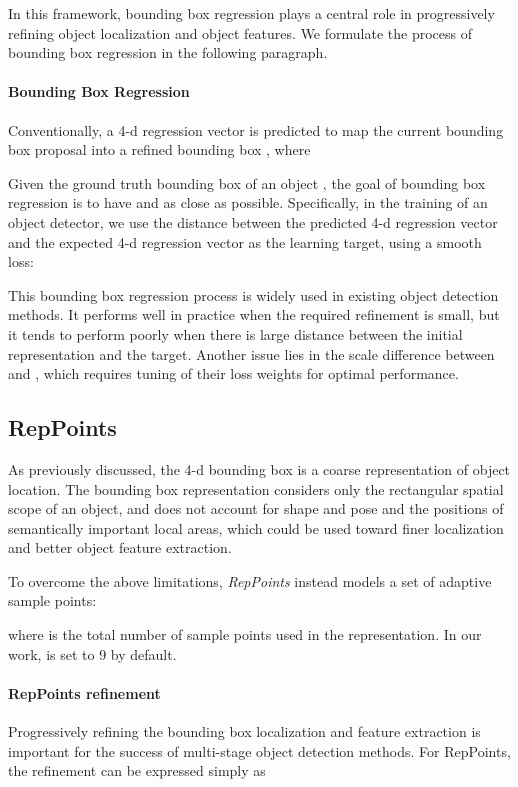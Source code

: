 \documentclass[10pt,twocolumn,letterpaper]{article}
\begin{document}
In this framework, bounding box regression plays a central role in progressively refining object localization and object features. We formulate the process of bounding box regression in the following paragraph.

\vspace{-5pt}
\paragraph{Bounding Box Regression} 
Conventionally, a 4-d regression vector  is predicted to map the current bounding box proposal  into a refined bounding box , where

 
Given the ground truth bounding box of an object , the goal of bounding box regression is to have  and  as close as possible. Specifically, in the training of an object detector, we use the distance between the predicted 4-d regression vector and the expected 4-d regression vector   as the learning target, using a smooth  loss: 
 

This bounding box regression process is widely used in existing object detection methods. It performs well in practice when the required refinement is small, but it tends to perform poorly when there is large distance between the initial representation and the target. Another issue lies in the scale difference between  and , which requires tuning of their loss weights for optimal performance.

\subsection{RepPoints}
\label{sec::reppoints}
As previously discussed, the 4-d bounding box is a coarse representation of object location. The bounding box representation considers only the rectangular spatial scope of an object, and does not account for shape and pose and the positions of semantically important local areas, which could be used toward finer localization and better object feature extraction. 

To overcome the above limitations, \textit{RepPoints} instead models a set of adaptive sample points:

where  is the total number of sample points used in the representation. In our work,  is set to 9 by default.

\vspace{-5pt}
\paragraph{RepPoints refinement} Progressively refining the bounding box localization and feature extraction is important for the success of multi-stage object detection methods. For RepPoints, the refinement can be expressed simply as
\end{document}
